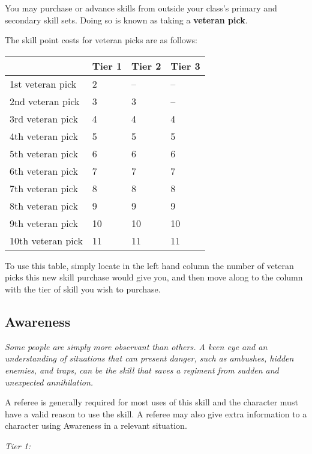 You may purchase or advance skills from outside your class's primary and secondary skill sets. Doing so is known as taking a \textbf{veteran pick}.

The skill point costs for veteran picks are as follows:

\begin{table}[H]
\begin{tabular}{|l|l|l|l|} \hline 
 & Tier 1 & Tier 2 & Tier 3 \\
 \hline 1st veteran pick & 2 & -- & -- \\
 \hline 2nd veteran pick & 3 & 3 & -- \\
 \hline 3rd veteran pick & 4 & 4 & 4 \\
 \hline 4th veteran pick & 5 & 5 & 5 \\
 \hline 5th veteran pick & 6 & 6 & 6 \\
 \hline 6th veteran pick & 7 & 7 & 7 \\
 \hline 7th veteran pick & 8 & 8 & 8 \\
 \hline 8th veteran pick & 9 & 9 & 9 \\
 \hline 9th veteran pick & 10 & 10 & 10 \\
 \hline 10th veteran pick & 11 & 11 & 11 \\
 \hline \end{tabular}

\end{table}

To use this table, simply locate in the left hand column the number of veteran picks this new skill purchase would give you, and then move along to the column with the tier of skill you wish to purchase.

\subsection{Awareness}

\textit{Some people are simply more observant than others. A keen eye and an understanding of situations that can present danger, such as ambushes, hidden enemies, and traps, can be the skill that saves a regiment from sudden and unexpected annihilation.}

A referee is generally required for most uses of this skill and the character must have a valid reason to use the skill. A referee may also give extra information to a character using Awareness in a relevant situation.

\textit{Tier 1:}

